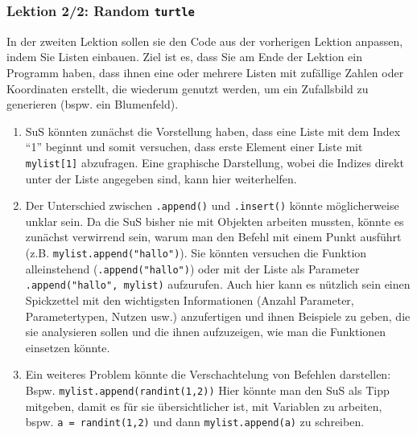 \begin{myExBox}[title=DL \themycounter]
\subsubsection*{Lektion 2/2: Random \lstinline|turtle|}
In der zweiten Lektion sollen sie den Code aus der vorherigen Lektion anpassen, indem Sie Listen einbauen. Ziel ist es, dass Sie am Ende der Lektion ein Programm haben, dass ihnen eine oder mehrere Listen mit zufällige Zahlen oder Koordinaten erstellt, die wiederum genutzt werden, um ein Zufallsbild zu generieren (bspw. ein Blumenfeld).

\begin{myExBox}[title=Mögliche Schwierigkeiten \& geeignete Massnahmen]
\begin{enumerate}
    \item SuS könnten zunächst die Vorstellung haben, dass eine Liste mit dem Index \enquote{1} beginnt und somit versuchen, dass erste Element einer Liste mit \lstinline|mylist[1]| abzufragen. Eine graphische Darstellung, wobei die Indizes direkt unter der Liste angegeben sind, kann hier weiterhelfen.
    \item Der Unterschied zwischen \lstinline|.append()| und \lstinline|.insert()| könnte möglicherweise unklar sein. Da die SuS bisher nie mit Objekten arbeiten mussten, könnte es zunächst verwirrend sein, warum man den Befehl mit einem Punkt ausführt (z.B. \lstinline|mylist.append("hallo")|). Sie könnten versuchen die Funktion alleinstehend (\lstinline|.append("hallo")|) oder mit der Liste als Parameter \lstinline|.append("hallo", mylist)| aufzurufen. Auch hier kann es nützlich sein einen Spickzettel mit den wichtigsten Informationen (Anzahl Parameter, Parametertypen, Nutzen usw.) anzufertigen und ihnen Beispiele zu geben, die sie analysieren sollen und die ihnen aufzuzeigen, wie man die Funktionen einsetzen könnte.
    \item Ein weiteres Problem könnte die Verschachtelung von Befehlen darstellen: Bspw. \lstinline|mylist.append(randint(1,2))| Hier könnte man den SuS als Tipp mitgeben, damit es für sie übersichtlicher ist, mit Variablen zu arbeiten, bspw. \lstinline|a = randint(1,2)| und dann \lstinline|mylist.append(a)| zu schreiben.
\end{enumerate}
\end{myExBox}
\end{myExBox}
\newpage{}

